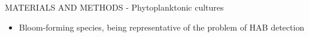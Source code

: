 \documentclass[handout]{beamer}
\newcommand\Fontable{\fontsize{9}{10}\selectfont}
\begin{document}
\begin{frame}{MATERIALS AND METHODS - Phytoplanktonic cultures}
\begin{minipage}[c]{1\linewidth}
\begin{minipage}[c]{0.7\linewidth}
\begin{itemize}
	\Fontable
	\item<3-> Bloom-forming species, being representative of the problem of HAB detection
\end{itemize}
\end{minipage}
\begin{minipage}[c]{0.29\linewidth}
\end{minipage}
\end{minipage}

\end{frame}

\end{document}
